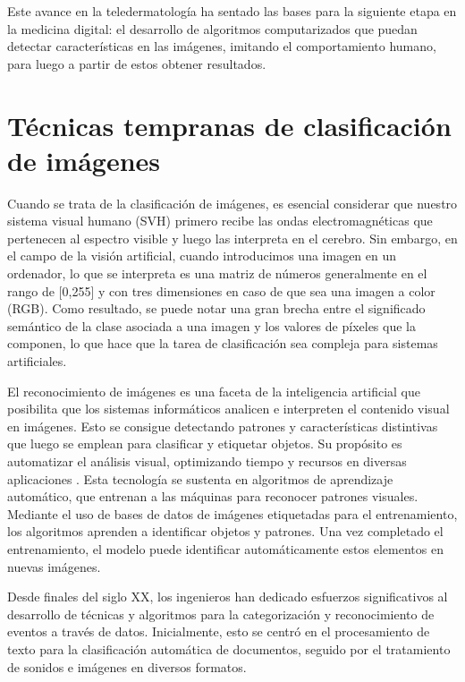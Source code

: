 Este avance en la teledermatología ha sentado las bases para la siguiente etapa en la medicina digital: el desarrollo de algoritmos computarizados que puedan detectar características en las imágenes, imitando el comportamiento humano, para luego a partir de estos obtener resultados.

\section{Técnicas tempranas de clasificación de imágenes} 

Cuando se trata de la clasificación de imágenes, es esencial considerar que nuestro sistema visual humano (SVH) primero recibe las ondas electromagnéticas que pertenecen al espectro visible y luego las interpreta en el cerebro. Sin embargo, en el campo de la visión artificial, cuando introducimos una imagen en un ordenador, lo que se interpreta es una matriz de números generalmente en el rango de [0,255] y con tres dimensiones en caso de que sea una imagen a color (RGB). Como resultado, se puede notar una gran brecha entre el significado semántico de la clase asociada a una imagen y los valores de píxeles que la componen, lo que hace que la tarea de clasificación sea compleja para sistemas artificiales. 

El reconocimiento de imágenes es una faceta de la inteligencia artificial que posibilita que los sistemas informáticos analicen e interpreten el contenido visual en imágenes. Esto se consigue detectando patrones y características distintivas que luego se emplean para clasificar y etiquetar objetos. Su propósito es automatizar el análisis visual, optimizando tiempo y recursos en diversas aplicaciones . Esta tecnología se sustenta en algoritmos de aprendizaje automático, que entrenan a las máquinas para reconocer patrones visuales. Mediante el uso de bases de datos de imágenes etiquetadas para el entrenamiento, los algoritmos aprenden a identificar objetos y patrones. Una vez completado el entrenamiento, el modelo puede identificar automáticamente estos elementos en nuevas imágenes.

Desde finales del siglo XX, los ingenieros han dedicado esfuerzos significativos al desarrollo de técnicas y algoritmos para la categorización y reconocimiento de eventos a través de datos. Inicialmente, esto se centró en el procesamiento de texto para la clasificación automática de documentos, seguido por el tratamiento de sonidos e imágenes en diversos formatos. 

